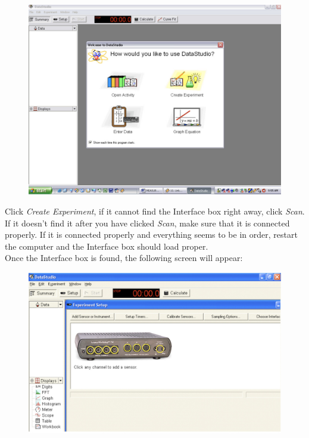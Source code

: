 \begin{figure}[ht]
  \centerline{\includegraphics[scale=0.45]{resources/photo2.jpg}}
\end{figure}

\newpage Click \emph{Create Experiment}, if it cannot find the Interface box right away, click \emph{Scan}.
If it doesn’t find it after you have clicked \emph{Scan}, make sure that it is connected properly.
If it is connected properly and everything seems 
to be in order, restart the computer and the Interface box should load proper.\\
Once the Interface box is found, the following screen will appear:

\begin{figure}[ht]
  \centerline{\includegraphics[scale=0.4]{resources/photo3.jpg}}
\end{figure}

